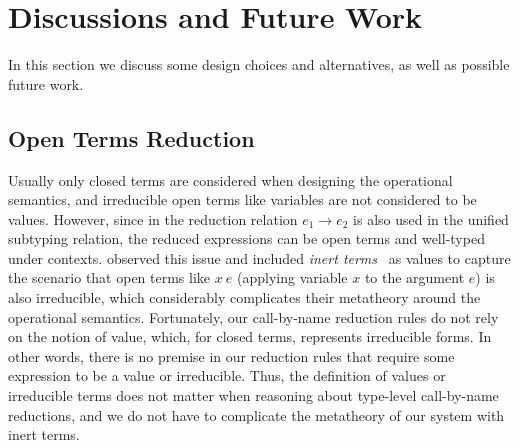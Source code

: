 \section{Discussions and Future Work}

In this section we discuss some design choices and alternatives, as well
as possible future work.

\subsection{Open Terms Reduction}
\label{sec:open-term-reduction}

Usually only closed terms are considered when designing the operational semantics,
and irreducible open terms like variables are not considered to be values.
However, since in \name the reduction relation $e_1 \longrightarrow e_2$ is also
used in the unified subtyping relation, the reduced expressions can be open terms and well-typed under contexts.
\citet{full} observed this issue and included \emph{inert terms}~\cite{opencbv} as values
to capture the scenario that open terms like $x~e$
(applying variable $x$ to the argument $e$) is also irreducible, which considerably
complicates their metatheory around the operational semantics.
Fortunately, our call-by-name reduction rules do not rely on the notion of value,
which, for closed terms, represents irreducible forms.
In other words, there is no premise in our reduction rules that require
some expression to be a value or irreducible.
Thus, the definition of values or irreducible terms does not matter when reasoning about
type-level call-by-name reductions, and we do not have to complicate the metatheory of our system
with inert terms.


